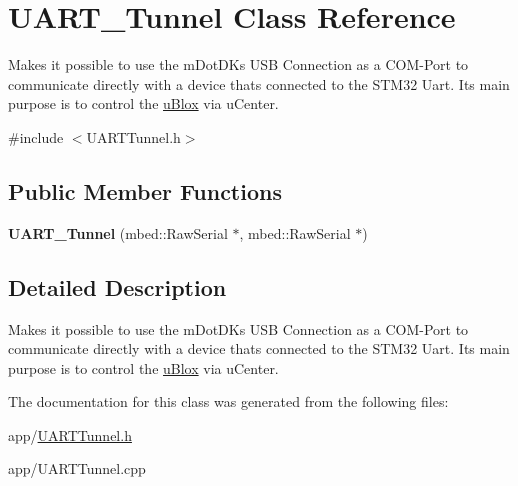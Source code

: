 \hypertarget{class_u_a_r_t___tunnel}{}\section{U\+A\+R\+T\+\_\+\+Tunnel Class Reference}
\label{class_u_a_r_t___tunnel}


Makes it possible to use the m\+Dot\+D\+Ks U\+S\+B Connection as a C\+O\+M-\/\+Port to communicate directly with a device thats connected to the S\+T\+M32 Uart. Its main purpose is to control the \hyperlink{classu_blox}{u\+Blox} via u\+Center.  




{\ttfamily \#include $<$U\+A\+R\+T\+Tunnel.\+h$>$}

\subsection*{Public Member Functions}
\begin{DoxyCompactItemize}
\item 
\hypertarget{class_u_a_r_t___tunnel_a2cbf358241fbe1e244222adc14f7dc6f}{}{\bfseries U\+A\+R\+T\+\_\+\+Tunnel} (mbed\+::\+Raw\+Serial $\ast$, mbed\+::\+Raw\+Serial $\ast$)\label{class_u_a_r_t___tunnel_a2cbf358241fbe1e244222adc14f7dc6f}

\end{DoxyCompactItemize}


\subsection{Detailed Description}
Makes it possible to use the m\+Dot\+D\+Ks U\+S\+B Connection as a C\+O\+M-\/\+Port to communicate directly with a device thats connected to the S\+T\+M32 Uart. Its main purpose is to control the \hyperlink{classu_blox}{u\+Blox} via u\+Center. 

The documentation for this class was generated from the following files\+:\begin{DoxyCompactItemize}
\item 
app/\hyperlink{_u_a_r_t_tunnel_8h}{U\+A\+R\+T\+Tunnel.\+h}\item 
app/U\+A\+R\+T\+Tunnel.\+cpp\end{DoxyCompactItemize}

